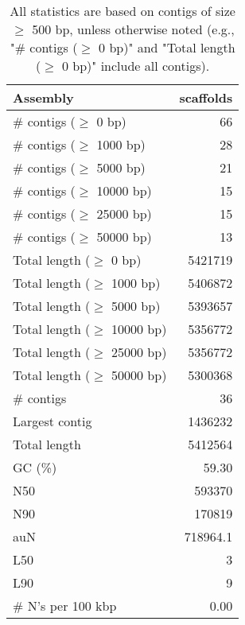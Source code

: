 \documentclass[12pt,a4paper]{article}
\begin{document}
\begin{table}[ht]
\begin{center}
\caption{All statistics are based on contigs of size $\geq$ 500 bp, unless otherwise noted (e.g., "\# contigs ($\geq$ 0 bp)" and "Total length ($\geq$ 0 bp)" include all contigs).}
\begin{tabular}{|l*{1}{|r}|}
\hline
Assembly & scaffolds \\ \hline
\# contigs ($\geq$ 0 bp) & 66 \\ \hline
\# contigs ($\geq$ 1000 bp) & 28 \\ \hline
\# contigs ($\geq$ 5000 bp) & 21 \\ \hline
\# contigs ($\geq$ 10000 bp) & 15 \\ \hline
\# contigs ($\geq$ 25000 bp) & 15 \\ \hline
\# contigs ($\geq$ 50000 bp) & 13 \\ \hline
Total length ($\geq$ 0 bp) & 5421719 \\ \hline
Total length ($\geq$ 1000 bp) & 5406872 \\ \hline
Total length ($\geq$ 5000 bp) & 5393657 \\ \hline
Total length ($\geq$ 10000 bp) & 5356772 \\ \hline
Total length ($\geq$ 25000 bp) & 5356772 \\ \hline
Total length ($\geq$ 50000 bp) & 5300368 \\ \hline
\# contigs & 36 \\ \hline
Largest contig & 1436232 \\ \hline
Total length & 5412564 \\ \hline
GC (\%) & 59.30 \\ \hline
N50 & 593370 \\ \hline
N90 & 170819 \\ \hline
auN & 718964.1 \\ \hline
L50 & 3 \\ \hline
L90 & 9 \\ \hline
\# N's per 100 kbp & 0.00 \\ \hline
\end{tabular}
\end{center}
\end{table}
\end{document}
